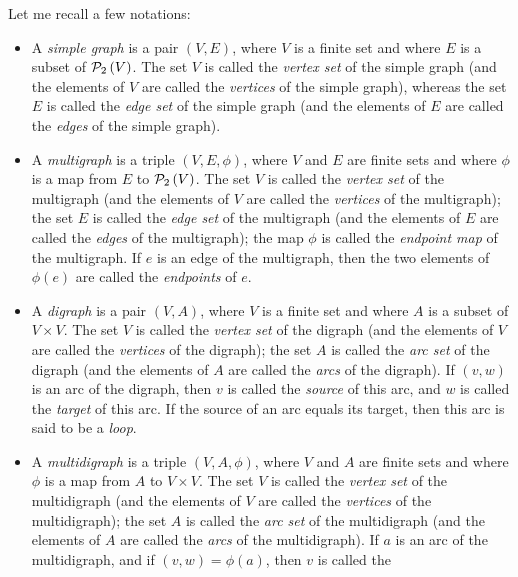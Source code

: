 \documentclass[numbers=enddot,12pt,final,onecolumn,notitlepage]{scrartcl}%
\theoremstyle{definition}
\newcommand{\powset}[2][]{\ifthenelse{\equal{#2}{}}{\mathcal{P}\left(#1\right)}{\mathcal{P}_{#1}\left(#2\right)}}
\newcommand{\tup}[1]{\left( #1 \right)}
\begin{document}
Let me recall a few notations:
\begin{itemize}
\item A \textit{simple graph} is a pair $\tup{V, E}$, where $V$ is a
      finite set and where $E$ is a subset of $\powset[2]{V}$.
      The set $V$ is called the \textit{vertex set} of the simple
      graph (and the elements of $V$ are called the \textit{vertices}
      of the simple graph),
      whereas the set $E$ is called the \textit{edge set} of the
      simple graph (and the elements of $E$ are called the
      \textit{edges} of the simple graph).
\item A \textit{multigraph} is a triple $\tup{V, E, \phi}$, where $V$
      and $E$ are finite sets and where $\phi$ is a map from $E$ to
      $\powset[2]{V}$. The set $V$ is called the \textit{vertex set}
      of the multigraph (and the elements of $V$ are called the
      \textit{vertices} of the multigraph); the set $E$ is called the
      \textit{edge set} of the multigraph (and the elements of $E$ are
      called the \textit{edges} of the multigraph); the map $\phi$ is
      called the \textit{endpoint map} of the multigraph. If $e$ is an
      edge of the multigraph, then the two elements of $\phi\tup{e}$
      are called the \textit{endpoints} of $e$.
\item A \textit{digraph} is a pair $\tup{V, A}$, where $V$ is a
      finite set and where $A$ is a subset of $V \times V$. The set
      $V$ is called the \textit{vertex set} of the digraph (and the
      elements of $V$ are called the \textit{vertices} of the
      digraph); the set $A$ is called the \textit{arc set} of the
      digraph (and the elements of $A$ are called the \textit{arcs}
      of the digraph). If $\tup{v, w}$ is an arc of the digraph, then
      $v$ is called the \textit{source} of this arc, and $w$ is called
      the \textit{target} of this arc. If the source of an arc equals
      its target, then this arc is said to be a \textit{loop}.
\item A \textit{multidigraph} is a triple $\tup{V, A, \phi}$, where
      $V$ and $A$ are finite sets and where $\phi$ is a map from $A$
      to $V \times V$. The set $V$ is called the \textit{vertex set}
      of the multidigraph (and the elements of $V$ are called the
      \textit{vertices} of the multidigraph); the set $A$ is called
      the \textit{arc set} of the multidigraph (and the elements of
      $A$ are called the \textit{arcs} of the multidigraph). If $a$
      is an arc of the multidigraph, and if
      $\tup{v, w} = \phi\tup{a}$, then $v$ is called the

\end{itemize}
\end{document}
